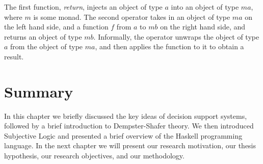 \documentclass[thesis.tex]{subfiles}
\begin{document}
The first function, \emph{return}, injects an object of type $a$ into an object of type $m a$, where
$m$ is some monad. The second operator takes in an object of type $m a$ on the left hand side, and
a function $f$ from $a$ to $m b$ on the right hand side, and returns an object of type $m b$.
Informally, the operator unwraps the object of type $a$ from the object of type $m a$, and then applies
the function to it to obtain a result.






\section{Summary}

In this chapter we briefly discussed the key ideas of decision support systems, followed by a brief
introduction to Dempster-Shafer theory. We then introduced Subjective Logic and presented a brief
overview of the Haskell programming language. In the next chapter we will present our
research motivation, our thesis hypothesis, our research objectives, and our methodology.
\end{document}
